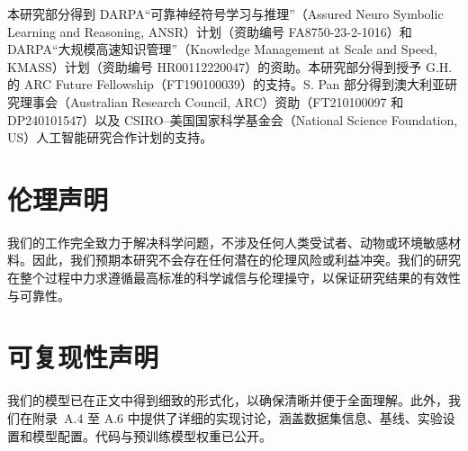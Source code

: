 \documentclass[11pt,UTF8,fontset=fandol]{ctexart}
\begin{document}
本研究部分得到 DARPA“可靠神经符号学习与推理”（Assured Neuro Symbolic Learning and Reasoning, ANSR）计划（资助编号 FA8750-23-2-1016）和 DARPA“大规模高速知识管理”（Knowledge Management at Scale and Speed, KMASS）计划（资助编号 HR00112220047）的资助。本研究部分得到授予 G.H. 的 ARC Future Fellowship（FT190100039）的支持。S. Pan 部分得到澳大利亚研究理事会（Australian Research Council, ARC）资助（FT210100097 和 DP240101547）以及 CSIRO–美国国家科学基金会（National Science Foundation, US）人工智能研究合作计划的支持。

\section*{伦理声明}

我们的工作完全致力于解决科学问题，不涉及任何人类受试者、动物或环境敏感材料。因此，我们预期本研究不会存在任何潜在的伦理风险或利益冲突。我们的研究在整个过程中力求遵循最高标准的科学诚信与伦理操守，以保证研究结果的有效性与可靠性。

\section*{可复现性声明}

我们的模型已在正文中得到细致的形式化，以确保清晰并便于全面理解。此外，我们在附录~A.4 至 A.6 中提供了详细的实现讨论，涵盖数据集信息、基线、实验设置和模型配置。代码与预训练模型权重已公开。
\end{document}
